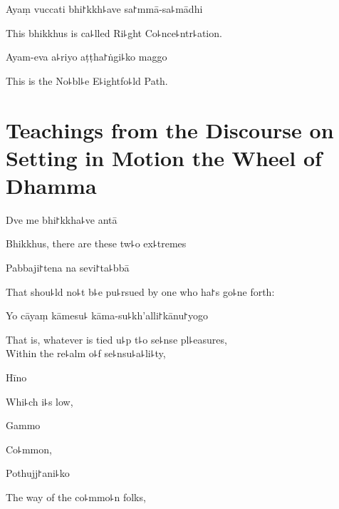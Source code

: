 Ayaṃ vuccati bhi꜓kkh꜕ave sa꜓mmā-sa꜕mādhi

\begin{english}
  This bhikkhus is ca꜕lled Ri꜕ght Co꜕nce꜕ntr꜕ation.
\end{english}

Ayam-eva a꜕riyo aṭṭha꜓ṅgi꜕ko maggo

\begin{english}
  This is the No꜕bl꜕e E꜕ightfo꜕ld Path.
\end{english}

\chapter[The Wheel of Dhamma]{Teachings from the Discourse on Setting in Motion the Wheel of Dhamma}%


\begin{leader}
\end{leader}

Dve me bhi꜓kkha꜕ve antā

\begin{english}
  Bhikkhus, there are these tw꜕o ex꜕tremes
\end{english}

Pabbaji꜓tena na sevi꜓ta꜕bbā

\begin{english}
  That shou꜕ld no꜕t b꜕e pu꜕rsued by one who ha꜓s go꜕ne forth:
\end{english}

Yo cāyaṃ kāmesu꜕ kāma-su꜕kh'alli꜓kānu꜓yogo

\begin{english}
  That is, whatever is tied u꜕p t꜕o se꜕nse pl꜕easures,\\
  Within the re꜕alm o꜕f se꜕nsu꜕a꜕li꜕ty,
\end{english}

Hīno

\begin{english}
  Whi꜕ch i꜕s low,
\end{english}

Gammo

\begin{english}
  Co꜕mmon,
\end{english}

Pothujj꜓ani꜕ko

\begin{english}
  The way of the co꜕mmo꜕n folks,
\end{english}


